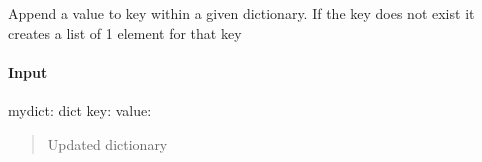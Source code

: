 \documentclass[letterpaper,10pt,english]{sphinxmanual}
\begin{document}

\begin{fulllineitems}
\label{\detokenize{api/pymusepipe:pymusepipe.util_pipe.append_value_to_dict}}
\pysigstartsignatures
{}
\pysigstopsignatures
\sphinxAtStartPar
Append a value to key within a given dictionary. If the key does not exist it creates
a list of 1 element for that key


\paragraph{Input}
\label{\detokenize{api/pymusepipe:id160}}
\sphinxAtStartPar
mydict: dict
key:
value:
\begin{quote}\begin{description}
\sphinxAtStartPar
Updated dictionary

\end{description}\end{quote}

\end{fulllineitems}

\end{document}
